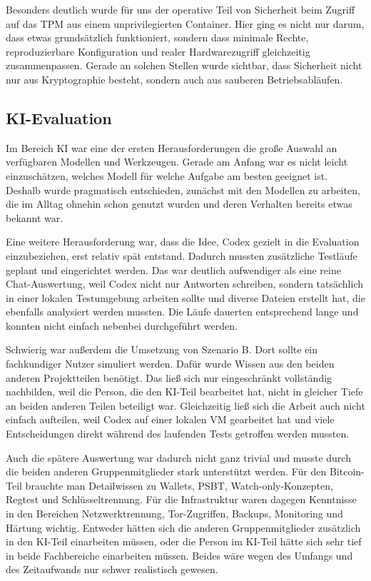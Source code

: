 Besonders deutlich wurde für uns der operative Teil von Sicherheit beim Zugriff auf das TPM aus einem unprivilegierten Container. Hier ging es nicht nur darum, dass etwas grundsätzlich funktioniert, sondern dass minimale Rechte, reproduzierbare Konfiguration und realer Hardwarezugriff gleichzeitig zusammenpassen. Gerade an solchen Stellen wurde sichtbar, dass Sicherheit nicht nur aus Kryptographie besteht, sondern auch aus sauberen Betriebsabläufen.

\subsection{KI-Evaluation}
Im Bereich \acs{KI} war eine der ersten Herausforderungen die große Auswahl an verfügbaren Modellen und Werkzeugen. Gerade am Anfang war es nicht leicht einzuschätzen, welches Modell für welche Aufgabe am besten geeignet ist. Deshalb wurde pragmatisch entschieden, zunächst mit den Modellen zu arbeiten, die im Alltag ohnehin schon genutzt wurden und deren Verhalten bereits etwas bekannt war.

Eine weitere Herausforderung war, dass die Idee, Codex gezielt in die Evaluation einzubeziehen, erst relativ spät entstand. Dadurch mussten zusätzliche Testläufe geplant und eingerichtet werden. Das war deutlich aufwendiger als eine reine Chat-Auswertung, weil Codex nicht nur Antworten schreiben, sondern tatsächlich in einer lokalen Testumgebung arbeiten sollte und diverse Dateien erstellt hat, die ebenfalls analysiert werden mussten. Die Läufe dauerten entsprechend lange und konnten nicht einfach nebenbei durchgeführt werden.

Schwierig war außerdem die Umsetzung von Szenario B. Dort sollte ein fachkundiger Nutzer simuliert werden. Dafür wurde Wissen aus den beiden anderen Projektteilen benötigt. Das ließ sich nur eingeschränkt vollständig nachbilden, weil die Person, die den \acs{KI}-Teil bearbeitet hat, nicht in gleicher Tiefe an beiden anderen Teilen beteiligt war. Gleichzeitig ließ sich die Arbeit auch nicht einfach aufteilen, weil Codex auf einer lokalen \acs{VM} gearbeitet hat und viele Entscheidungen direkt während des laufenden Tests getroffen werden mussten.

Auch die spätere Auswertung war dadurch nicht ganz trivial und musste durch die beiden anderen Gruppenmitglieder stark unterstützt werden. Für den Bitcoin-Teil brauchte man Detailwissen zu Wallets, PSBT, Watch-only-Konzepten, Regtest und Schlüsseltrennung. Für die Infrastruktur waren dagegen Kenntnisse in den Bereichen Netzwerktrennung, Tor-Zugriffen, Backups, Monitoring und Härtung wichtig. Entweder hätten sich die anderen Gruppenmitglieder zusätzlich in den \acs{KI}-Teil einarbeiten müssen, oder die Person im \acs{KI}-Teil hätte sich sehr tief in beide Fachbereiche einarbeiten müssen. Beides wäre wegen des Umfangs und des Zeitaufwands nur schwer realistisch gewesen.

